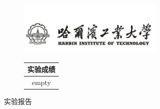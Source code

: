 \begin{titlepage}

    \begin{center}


        \begin{figure}[htbp]

            \begin{minipage}[b]{.5\linewidth}
                \includegraphics[width=7cm]{HIT.jpg}
            \end{minipage}
            \begin{minipage}[b]{.5\linewidth}
                \centering
                \begin{tabular}{|c|}
                    \hline
                    实验成绩 \\ \hline
                    empty    \\ \hline
                \end{tabular}
            \end{minipage}
        \end{figure}

        \vfill




        {\fontsize{42pt}\baselineskip 实验报告}\\[5.5cm]





\end{center}
\end{titlepage}
